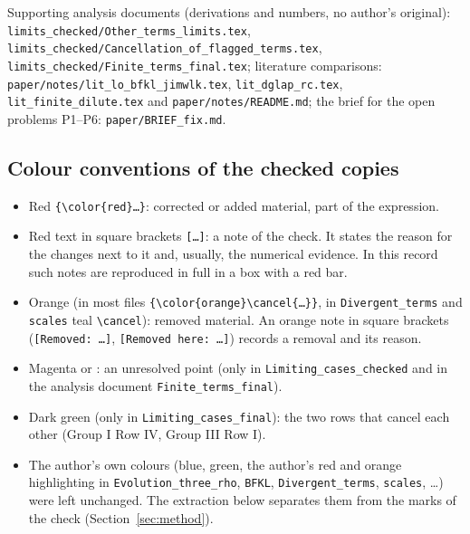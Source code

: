 \documentclass[10pt]{article}
\begin{document}
\noindent Supporting analysis documents (derivations and numbers, no author's original): \texttt{limits\_checked/Other\_terms\_limits.tex}, \texttt{limits\_checked/Cancellation\_of\_flagged\_terms.tex}, \texttt{limits\_checked/Finite\_terms\_final.tex}; literature comparisons: \texttt{paper/notes/lit\_lo\_bfkl\_jimwlk.tex}, \texttt{lit\_dglap\_rc.tex}, \texttt{lit\_finite\_dilute.tex} and \texttt{paper/notes/README.md}; the brief for the open problems P1--P6: \texttt{paper/BRIEF\_fix.md}.

\subsection{Colour conventions of the checked copies}
\begin{itemize}
\item {\color{red}Red} \texttt{\{\textbackslash color\{red\}\dots\}}: corrected or added material, part of the expression.
\item Red text in square brackets \texttt{[\dots]}: a note of the check. It states the reason for the changes next to it and, usually, the numerical evidence. In this record such notes are reproduced in full in a box with a red bar.
\item {\color{orange}Orange} (in most files \texttt{\{\textbackslash color\{orange\}\textbackslash cancel\{\dots\}\}}, in \texttt{Divergent\_terms} and \texttt{scales} {\color{teal}teal} \texttt{\textbackslash cancel}): removed material. An orange note in square brackets (\texttt{[Removed: \dots]}, \texttt{[Removed here: \dots]}) records a removal and its reason.
\item {\color{magenta}Magenta}  or : an unresolved point (only in \texttt{Limiting\_cases\_checked} and in the analysis document \texttt{Finite\_terms\_final}).
\item {\color{dkgreen}Dark green} (only in \texttt{Limiting\_cases\_final}): the two rows that cancel each other (Group I Row IV, Group III Row I).
\item The author's own colours (blue, green, the author's red and orange highlighting in \texttt{Evolution\_three\_rho}, \texttt{BFKL}, \texttt{Divergent\_terms}, \texttt{scales}, \dots) were left unchanged. The extraction below separates them from the marks of the check (Section~\ref{sec:method}).
\end{itemize}
\end{document}
